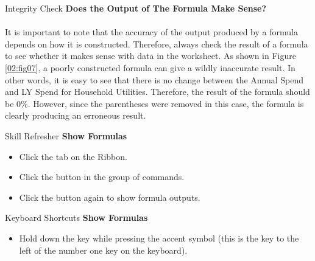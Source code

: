 \begin{center}
	\begin{infobox}{Integrity Check}
		\textbf{Does the Output of The Formula Make Sense?}
		\\
		\\
		It is important to note that the accuracy of the output produced by a formula depends on how it is constructed. Therefore, always check the result of a formula to see whether it makes sense with data in the worksheet. As shown in Figure \ref{02:fig07}, a poorly constructed formula can give a wildly inaccurate result. In other words, it is easy to see that there is no change between the Annual Spend and LY Spend for Household Utilities. Therefore, the result of the formula should be $ 0 $\%. However, since the parentheses were removed in this case, the formula is clearly producing an erroneous result.
	\end{infobox}
\end{center}

\begin{center}
	\begin{sklbox}{Skill Refresher}
		\textbf{Show Formulas}
		\\
		\begin{itemize}
			\setlength{\itemsep}{0pt}
			\setlength{\parskip}{0pt}
			\setlength{\parsep}{0pt}
			
			\item Click the  tab on the Ribbon.
			\item Click the  button in the  group of commands.
			\item Click the  button again to show formula outputs.
			
		\end{itemize}
	\end{sklbox}
\end{center}

\begin{center}
	\begin{shtcutbox}{Keyboard Shortcuts}
		\textbf{Show Formulas}
		\\
		\begin{itemize}
			\setlength{\itemsep}{0pt}
			\setlength{\parskip}{0pt}
			\setlength{\parsep}{0pt}
			
			\item Hold down the  key while pressing the accent symbol  (this is the key to the left of the number one key on the keyboard).
			
		\end{itemize}
	\end{shtcutbox}
\end{center}

